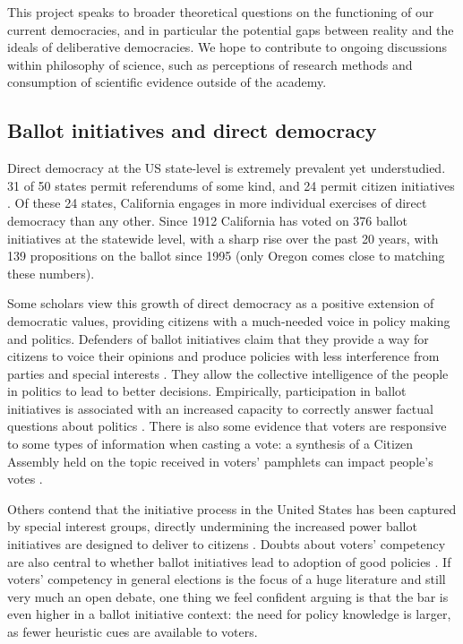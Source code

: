 \documentclass[12pt,final,fleqn]{article}
\theoremstyle{plain}
\begin{document}
This project speaks to broader theoretical questions on the functioning of our current democracies, and in particular the potential gaps between reality and the ideals of deliberative democracies. We hope to contribute to ongoing discussions within philosophy of science, such as perceptions of research methods and consumption of scientific evidence outside of the academy.

\subsection{Ballot initiatives and direct democracy}

Direct democracy at the US state-level is extremely prevalent yet understudied. 31 of 50 states permit referendums of some kind, and 24 permit citizen initiatives \citep{leduc2003politics}. Of these 24 states, California engages in more individual exercises of direct democracy than any other. Since 1912 California has voted on 376 ballot initiatives at the statewide level, with a sharp rise over the past 20 years, with 139 propositions on the ballot since 1995 (only Oregon comes close to matching these numbers).

Some scholars view this growth of direct democracy as a positive extension of democratic values, providing citizens with a much-needed voice in policy making and politics. Defenders of ballot initiatives claim that they provide a way for citizens to voice their opinions and produce policies with less interference from parties and special interests \citep{cronin1999direct}. They allow the collective intelligence of the people in politics \citep{landemore2012many} to lead to better decisions. Empirically, participation in ballot initiatives is associated with an increased capacity to correctly answer factual questions about politics \citep{smith2002ballot}. There is also some evidence that voters are responsive to some types of information when casting a vote: a synthesis of a Citizen Assembly held on the topic received in voters' pamphlets can impact people's votes \citep{carman2015effectiveness}. 

Others contend that the initiative process in the United States has been captured by special interest groups, directly undermining the increased power ballot initiatives are designed to deliver to citizens \citep{stratmann2004effectiveness, rosenbluth2018responsible}. Doubts about voters' competency are also central to whether ballot initiatives lead to adoption of good policies \citep{achen2017democracy}. If voters' competency in general elections is the focus of a huge literature and still very much an open debate, one thing we feel confident arguing is that the bar is even higher in a ballot initiative context: the need for policy knowledge is larger, as fewer heuristic cues are available to voters.  
\end{document}
